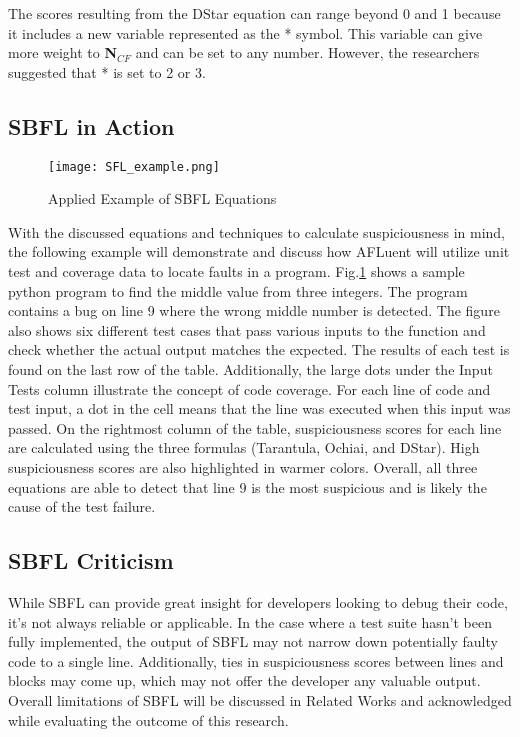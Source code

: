 The scores resulting from the DStar equation can range beyond 0 and 1 because it includes
a new variable represented as the * symbol. This variable can give more
weight to \textbf{N$_{CF}$} and can be set to any number. However, the
researchers suggested that * is set to 2 or 3.

\subsection{SBFL in Action}
\label{subsec:SBFLinAction}

\begin{figure}[!htb]
	\begin{center}
		\texttt{[image: SFL\_example.png]}
		\caption{\label{fig:sbfl_example} Applied Example of SBFL Equations}
	\end{center}
\end{figure}

With the discussed equations and techniques to calculate suspiciousness in mind,
the following example will demonstrate and discuss how AFLuent will utilize unit
test and coverage data to locate faults in a program.
Fig.\ref{fig:sbfl_example}
shows a sample python program to find the middle value
from three integers. The program contains a bug on line 9 where the wrong middle
number is detected. The figure also shows six different test cases that pass
various inputs to the function and check whether the actual output matches the
expected. The results of each test is found on the last row of the table.
Additionally, the large dots under the Input Tests column illustrate the concept
of code coverage. For each line of code and test input, a dot in the cell means
that the line was executed when this input was passed. On the rightmost column
of the table, suspiciousness scores for each line are calculated using the three
formulas (Tarantula, Ochiai, and DStar). High suspiciousness scores are also
highlighted in warmer colors. Overall, all three equations are able to detect
that line 9 is the most suspicious and is likely the cause of the test failure.

\subsection{SBFL Criticism}
\label{subsec:Criticism}

While SBFL can provide great insight for developers looking to debug their code,
it's not always reliable or applicable. In the case where a test suite hasn't
been fully implemented, the output of SBFL may not narrow down potentially faulty
code to a single line. Additionally, ties in suspiciousness scores between lines
and blocks may come up, which may not offer the developer any valuable output.
Overall limitations of SBFL will be discussed in Related Works and acknowledged
while evaluating the outcome of this research.

